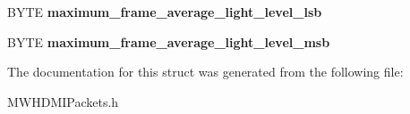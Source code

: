 \begin{DoxyCompactItemize}
\item 
\hypertarget{struct__HDMI__HDR__INFOFRAME__PAYLOAD_a761a679553e2e95cacc618501ab2ac1b}{B\-Y\-T\-E {\bfseries maximum\-\_\-frame\-\_\-average\-\_\-light\-\_\-level\-\_\-lsb}}\label{struct__HDMI__HDR__INFOFRAME__PAYLOAD_a761a679553e2e95cacc618501ab2ac1b}

\item 
\hypertarget{struct__HDMI__HDR__INFOFRAME__PAYLOAD_abf7a1664f9eb67bfc9fd118937a76043}{B\-Y\-T\-E {\bfseries maximum\-\_\-frame\-\_\-average\-\_\-light\-\_\-level\-\_\-msb}}\label{struct__HDMI__HDR__INFOFRAME__PAYLOAD_abf7a1664f9eb67bfc9fd118937a76043}

\end{DoxyCompactItemize}


The documentation for this struct was generated from the following file\-:\begin{DoxyCompactItemize}
\item 
M\-W\-H\-D\-M\-I\-Packets.\-h\end{DoxyCompactItemize}
